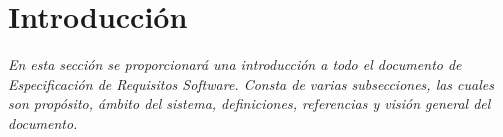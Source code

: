 \newpage

\section{Introducción}
\par \emph{En   esta   sección   se   proporcionará   una   introducción   a   todo   el   documento   de Especificación  de  Requisitos  Software.  Consta  de  varias  subsecciones,  las  cuales  son propósito, ámbito del sistema, definiciones, referencias y visión general del documento.}






